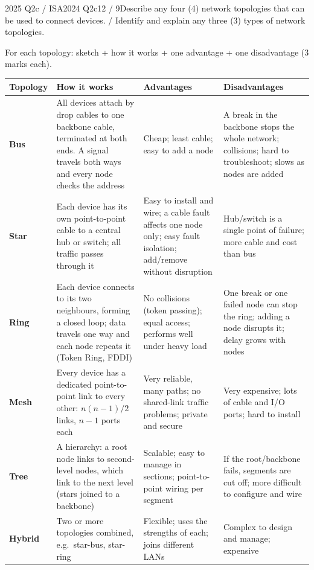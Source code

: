 \documentclass[10pt]{article}
\begin{document}
\begin{pastq}{2025 Q2c \textnormal{/} ISA2024 Q2c}{12 / 9}Describe any four (4) network topologies that can be used to connect devices. / Identify and explain any three (3) types of network topologies.\end{pastq}
\begin{ans}
\small
For each topology: sketch + how it works + one advantage + one disadvantage (3 marks each).
\smallskip

\begin{tabularx}{\linewidth}{@{}>{\bfseries}p{1.4cm}XXX@{}}
\toprule
Topology & How it works & Advantages & Disadvantages\\\midrule
Bus & All devices attach by drop cables to one backbone cable, terminated at both ends. A signal travels both ways and every node checks the address & Cheap; least cable; easy to add a node & A break in the backbone stops the whole network; collisions; hard to troubleshoot; slows as nodes are added\\
Star & Each device has its own point-to-point cable to a central hub or switch; all traffic passes through it & Easy to install and wire; a cable fault affects one node only; easy fault isolation; add/remove without disruption & Hub/switch is a single point of failure; more cable and cost than bus\\
Ring & Each device connects to its two neighbours, forming a closed loop; data travels one way and each node repeats it (Token Ring, FDDI) & No collisions (token passing); equal access; performs well under heavy load & One break or one failed node can stop the ring; adding a node disrupts it; delay grows with nodes\\
Mesh & Every device has a dedicated point-to-point link to every other: $n(n-1)/2$ links, $n-1$ ports each & Very reliable, many paths; no shared-link traffic problems; private and secure & Very expensive; lots of cable and I/O ports; hard to install\\
Tree & A hierarchy: a root node links to second-level nodes, which link to the next level (stars joined to a backbone) & Scalable; easy to manage in sections; point-to-point wiring per segment & If the root/backbone fails, segments are cut off; more difficult to configure and wire\\
Hybrid & Two or more topologies combined, e.g.\ star-bus, star-ring & Flexible; uses the strengths of each; joins different LANs & Complex to design and manage; expensive\\
\bottomrule
\end{tabularx}
\end{ans}
\end{document}
